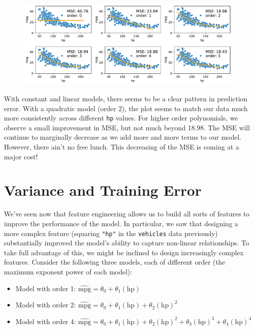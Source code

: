\documentclass[
  letterpaper,
  DIV=11,
  numbers=noendperiod]{scrreprt}
\providecommand{\tightlist}{%
  \setlength{\itemsep}{0pt}\setlength{\parskip}{0pt}}\usepackage{longtable,booktabs,array}
\begin{document}
\begin{figure}[H]

{\centering \includegraphics{feature_engineering/feature_engineering_files/figure-pdf/cell-5-output-1.pdf}

}

\end{figure}

With constant and linear models, there seems to be a clear pattern in
prediction error. With a quadratic model (order 2), the plot seems to
match our data much more consistently across different \texttt{hp}
values. For higher order polynomials, we observe a small improvement in
MSE, but not much beyond 18.98. The MSE will continue to marginally
decrease as we add more and more terms to our model. However, there
ain't no free lunch. This decreasing of the MSE is coming at a major
cost!

\hypertarget{variance-and-training-error}{%
\section{Variance and Training
Error}\label{variance-and-training-error}}

We've seen now that feature engineering allows us to build all sorts of
features to improve the performance of the model. In particular, we saw
that designing a more complex feature (squaring \texttt{"hp"} in the
\texttt{vehicles} data previously) substantially improved the model's
ability to capture non-linear relationships. To take full advantage of
this, we might be inclined to design increasingly complex features.
Consider the following three models, each of different order (the
maximum exponent power of each model):

\begin{itemize}
\tightlist
\item
  Model with order 1:
  \(\hat{\text{mpg}} = \theta_0 + \theta_1 (\text{hp})\)
\item
  Model with order 2:
  \(\hat{\text{mpg}} = \theta_0 + \theta_1 (\text{hp}) + \theta_2 (\text{hp})^2\)
\item
  Model with order 4:
  \(\hat{\text{mpg}} = \theta_0 + \theta_1 (\text{hp}) + \theta_2 (\text{hp})^2 + \theta_3 (\text{hp})^3 + \theta_4 (\text{hp})^4\)
\end{itemize}
\end{document}
